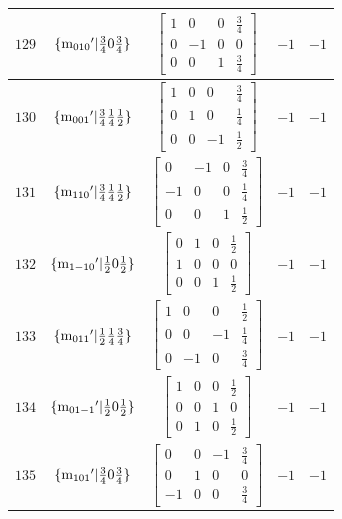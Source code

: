 \documentclass[fleqn,8pt]{jsarticle}
\begin{document}
\begin{longtable}{ccccc}
$ 129 $ & $ \{{\rm m}_{010}{}'|\frac{3}{4} 0 \frac{3}{4}\} $ & $ \begin{bmatrix} 1 & 0 & 0 & \frac{3}{4} \\ 0 & -1 & 0 & 0 \\ 0 & 0 & 1 & \frac{3}{4} \end{bmatrix} $ & $ -1 $ & $ -1 $ \\ \hline
$ 130 $ & $ \{{\rm m}_{001}{}'|\frac{3}{4} \frac{1}{4} \frac{1}{2}\} $ & $ \begin{bmatrix} 1 & 0 & 0 & \frac{3}{4} \\ 0 & 1 & 0 & \frac{1}{4} \\ 0 & 0 & -1 & \frac{1}{2} \end{bmatrix} $ & $ -1 $ & $ -1 $ \\ \hline
$ 131 $ & $ \{{\rm m}_{110}{}'|\frac{3}{4} \frac{1}{4} \frac{1}{2}\} $ & $ \begin{bmatrix} 0 & -1 & 0 & \frac{3}{4} \\ -1 & 0 & 0 & \frac{1}{4} \\ 0 & 0 & 1 & \frac{1}{2} \end{bmatrix} $ & $ -1 $ & $ -1 $ \\ \hline
$ 132 $ & $ \{{\rm m}_{1-10}{}'|\frac{1}{2} 0 \frac{1}{2}\} $ & $ \begin{bmatrix} 0 & 1 & 0 & \frac{1}{2} \\ 1 & 0 & 0 & 0 \\ 0 & 0 & 1 & \frac{1}{2} \end{bmatrix} $ & $ -1 $ & $ -1 $ \\ \hline
$ 133 $ & $ \{{\rm m}_{011}{}'|\frac{1}{2} \frac{1}{4} \frac{3}{4}\} $ & $ \begin{bmatrix} 1 & 0 & 0 & \frac{1}{2} \\ 0 & 0 & -1 & \frac{1}{4} \\ 0 & -1 & 0 & \frac{3}{4} \end{bmatrix} $ & $ -1 $ & $ -1 $ \\ \hline
$ 134 $ & $ \{{\rm m}_{01-1}{}'|\frac{1}{2} 0 \frac{1}{2}\} $ & $ \begin{bmatrix} 1 & 0 & 0 & \frac{1}{2} \\ 0 & 0 & 1 & 0 \\ 0 & 1 & 0 & \frac{1}{2} \end{bmatrix} $ & $ -1 $ & $ -1 $ \\ \hline
$ 135 $ & $ \{{\rm m}_{101}{}'|\frac{3}{4} 0 \frac{3}{4}\} $ & $ \begin{bmatrix} 0 & 0 & -1 & \frac{3}{4} \\ 0 & 1 & 0 & 0 \\ -1 & 0 & 0 & \frac{3}{4} \end{bmatrix} $ & $ -1 $ & $ -1 $ \\ \hline

\end{longtable}
\end{document}
